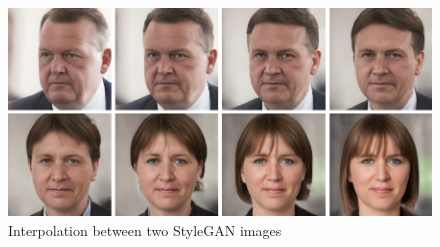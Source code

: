 \begin{figure}
  \includegraphics[width=\textwidth]{fig/stylegan/interpolation}
  \caption{Interpolation between two StyleGAN images}
  \label{StyleGAN-interpolation}
\end{figure}




%


